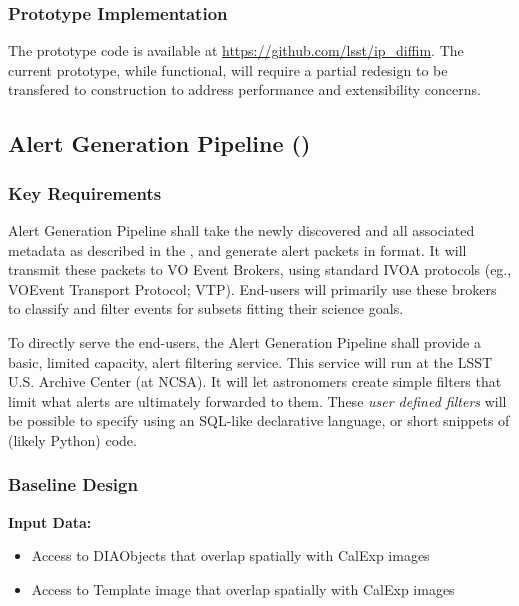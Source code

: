 \subsubsection{Prototype Implementation}

The prototype code is available at \url{https://github.com/lsst/ip_diffim}. The current prototype, while functional, will require a partial redesign to be transfered to construction to address performance and extensibility concerns.

\clearpage

\subsection{Alert Generation Pipeline (\wbsAP)}

\subsubsection{Key Requirements}

Alert Generation Pipeline shall take the newly discovered \DIASources and all associated metadata as described
in the \DPDD, and generate alert packets in \VOEvent format. It will transmit these packets to VO Event
Brokers, using standard IVOA protocols (eg., VOEvent Transport Protocol; VTP\@). End-users will primarily use these brokers to classify and filter events for subsets fitting their science goals.

To directly serve the end-users, the Alert Generation Pipeline shall provide a basic, limited capacity, alert filtering service. This service will run at the LSST U.S. Archive Center (at NCSA). It will let astronomers create simple filters that limit what alerts are ultimately forwarded to them. These \emph{user defined filters} will be possible to specify using an SQL-like declarative language, or short snippets of (likely Python) code.

\subsubsection{Baseline Design}

{\bf Input Data:}\\
\begin{itemize}
\item Access to DIAObjects that overlap spatially with CalExp images 
\item Access to Template image that overlap spatially with CalExp images  
\end{itemize}


